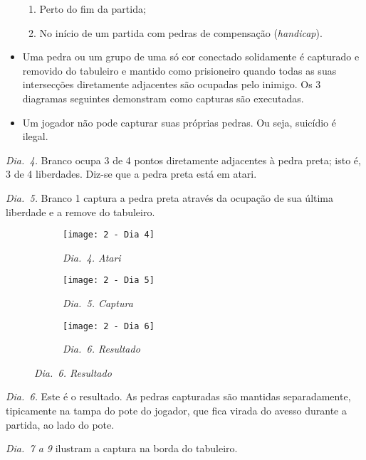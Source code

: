 \begin{itemize}
    \begin{enumerate}
        \item Perto do fim da partida;
        \item No início de um partida com pedras de compensação (\emph{handicap}).
    \end{enumerate}
    \item[\textbf{Regra 5}] Uma pedra ou um grupo de uma só cor conectado solidamente é capturado e removido do tabuleiro e mantido como prisioneiro quando todas as suas intersecções diretamente adjacentes são ocupadas pelo inimigo. Os 3 diagramas seguintes demonstram como capturas são executadas.
    \item[\textbf{Regra 6}] Um jogador não pode capturar suas próprias pedras. Ou seja, suicídio é ilegal.
\end{itemize}

\emph{Dia.\@~4.} Branco ocupa 3 de 4 pontos diretamente adjacentes à pedra preta; isto é, 3 de 4 liberdades. Diz-se que a pedra preta está em atari.

\emph{Dia.\@~5.} Branco 1 captura a pedra preta através da ocupação de sua última liberdade e a remove do tabuleiro.

\begin{figure}[h]
    \centering
    \begin{subfigure}{.3\textwidth}
        \centering
        \texttt{[image: 2 - Dia 4]}
        \captionsetup{justification=centering}
        \caption*{\emph{Dia.\@~4. Atari}}
    \end{subfigure}
    \begin{subfigure}{.3\textwidth}
        \centering
        \texttt{[image: 2 - Dia 5]}
        \captionsetup{justification=centering}
        \caption*{\emph{Dia.\@~5. Captura}}
    \end{subfigure}
    \begin{subfigure}{.3\textwidth}
        \centering
        \texttt{[image: 2 - Dia 6]}
        \captionsetup{justification=centering}
        \caption*{\emph{Dia.\@~6. Resultado}}
    \end{subfigure}
\end{figure}

\emph{Dia.\@~6.} Este é o resultado. As pedras capturadas são mantidas separadamente, tipicamente na tampa do pote do jogador, que fica virada do avesso durante a partida, ao lado do pote.

\emph{Dia.\@~7 a 9} ilustram a captura na borda do tabuleiro.

